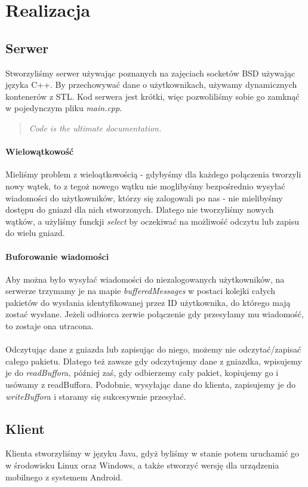 \documentclass[10pt,a4paper]{article}
\begin{document}
\section{Realizacja}
	\subsection{Serwer}Stworzyliśmy serwer używając poznanych na zajęciach socketów BSD używając języka C++.
	By przechowywać dane o użytkownikach, używamy dynamicznych kontenerów z STL.
	Kod serwera jest krótki, więc pozwoliliśmy sobie go zamknąć w pojedynczym pliku \textit{main.cpp}.
	\begin{quote}
		\textit{Code is the ultimate documentation.}
	\end{quote}
	\paragraph{Wielowątkowość}Mieliśmy problem z wieloątkowością - gdybyśmy dla każdego połączenia tworzyli
	nowy wątek, to z tegoż nowego wątku nie moglibyśmy bezpośrednio wysyłać wiadomości do użytkowników, którzy
	się zalogowali po nas - nie mielibyśmy dostępu do gniazd dla nich stworzonych. Dlatego nie tworzyliśmy nowych
	wątków, a użyliśmy funckji \textit{select} by oczekiwać na możliwość odczytu lub zapisu do wielu gniazd.
	\paragraph{Buforowanie wiadomości}Aby można było wysyłać wiadomości do niezalogowanych użytkowników, na serwerze
	trzymamy je na mapie \textit{bufferedMessages} w postaci kolejki całych pakietów do wysłania identyfikowanej przez
	ID użytkownika, do którego mają zostać wysłane. Jeżeli odbiorca zerwie połączenie gdy przesyłamy mu wiadomość, to
	zostaje ona utracona.
	\paragraph{}Odczytując dane z gniazda lub zapisując do niego, możemy nie odczytać/zapisać całego pakietu.
	Dlatego też zawsze gdy odczytujemy dane z gniazdka, wpisujemy je do \textit{readBuffor}a, później zaś, gdy
	odbierzemy cały pakiet, kopiujemy go i usówamy z readBuffora. Podobnie, wysyłając dane do klienta, zapisujemy je do
	\textit{writeBuffor}a i staramy się sukcesywnie przesyłać.
	
	\subsection{Klient}Klienta stworzyliśmy w języku Java, gdyż byliśmy w stanie potem uruchamić go w środowisku
	Linux oraz Windows, a także stworzyć wersję dla urządzenia mobilnego z systemem Android.
	
\end{document}
